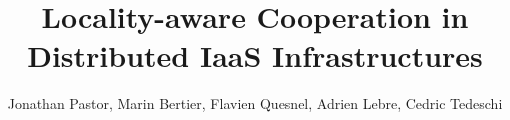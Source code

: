 \documentclass[runningheads,a4paper]{llncs2e/llncs}
\begin{document}
\mainmatter  %

\title{Locality-aware Cooperation in Distributed IaaS Infrastructures}

%
%
\author{Jonathan Pastor, Marin Bertier, Flavien Quesnel, Adrien Lebre, Cedric Tedeschi}
%


\maketitle















%
%
%
%
%
%
%

%
%

%
\end{document}
